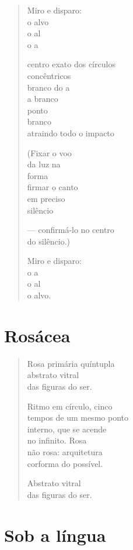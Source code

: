 \begin{verse}
Miro e disparo:\\
o alvo\\
o al\\
o a

centro exato dos círculos\\
concêntricos\\
branco do a\\
a branco\\
\quad{}ponto\\
\quad{}branco\\
atraindo todo o impacto

(Fixar o voo\\
da luz na\\
\quad{}forma\\
firmar o canto\\
em preciso\\
silêncio

--- confirmá-lo no centro\\
\quad\quad\quad{}do silêncio.)

Miro e disparo:\\
o a\\
o al\\
o alvo.
\end{verse}

\chapter{Rosácea}

\begin{verse}
Rosa primária quíntupla\\
abstrato vitral\\
das figuras do ser.

Ritmo em círculo, cinco\\
tempos de um mesmo ponto\\
interno, que se acende\\
no infinito. Rosa\\
não rosa: arquitetura\\
corforma do possível.

Abstrato vitral\\
das figuras do ser.
\end{verse}

\chapter{Sob a língua}

